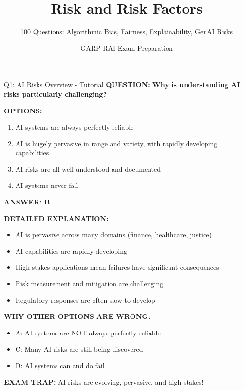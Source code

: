 \documentclass[8pt]{beamer}
\title{Risk and Risk Factors}
\subtitle{100 Questions: Algorithmic Bias, Fairness, Explainability, GenAI Risks}
\author{GARP RAI Exam Preparation}
\date{}
\begin{document}
	
	\begin{frame}
		\titlepage
	\end{frame}
	
	
	\begin{frame}{Q1: AI Risks Overview - Tutorial}
		\fontsize{6.5}{7.5}\selectfont
		\textbf{QUESTION: Why is understanding AI risks particularly challenging?}
		
		\vspace{0.1cm}
		\textbf{OPTIONS:}
		\begin{enumerate}
			\item AI systems are always perfectly reliable
			\item AI is hugely pervasive in range and variety, with rapidly developing capabilities
			\item AI risks are all well-understood and documented
			\item AI systems never fail
		\end{enumerate}
		
		\vspace{0.1cm}
		\textcolor{myblue}{\textbf{ANSWER: B}}
		
		\vspace{0.1cm}
		\textbf{DETAILED EXPLANATION:}
		\begin{itemize}
			\item AI is pervasive across many domains (finance, healthcare, justice)
			\item AI capabilities are rapidly developing
			\item High-stakes applications mean failures have significant consequences
			\item Risk measurement and mitigation are challenging
			\item Regulatory responses are often slow to develop
		\end{itemize}
		
		\vspace{0.1cm}
		\textcolor{myred}{\textbf{WHY OTHER OPTIONS ARE WRONG:}}
		\begin{itemize}
			\item \textcolor{myred}{A:} AI systems are NOT always perfectly reliable
			\item \textcolor{myred}{C:} Many AI risks are still being discovered
			\item \textcolor{myred}{D:} AI systems can and do fail
		\end{itemize}
		
		\textcolor{myred}{\textbf{EXAM TRAP:}} AI risks are \textcolor{myblue}{evolving, pervasive, and high-stakes}!
	\end{frame}
	
\end{document}
